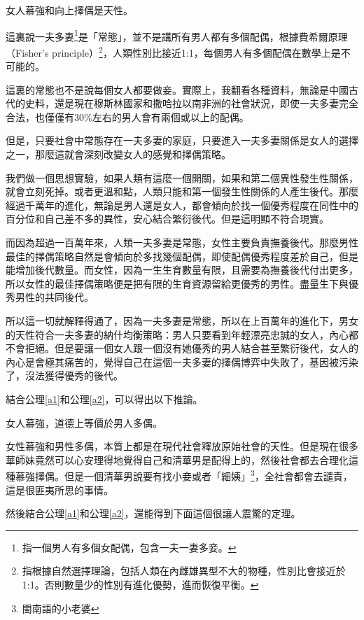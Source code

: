 \begin{theorem}\label{t1}
女人慕強和向上擇偶是天性。
\end{theorem}

這裏說一夫多妻\footnote{指一個男人有多個女配偶，包含一夫一妻多妾。}是「常態」，並不是講所有男人都有多個配偶，根據費希爾原理（Fisher's principle）\footnote{指根據自然選擇理論，包括人類在內雌雄異型不大的物種，性別比會接近於1:1。否則數量少的性別有進化優勢，進而恢復平衡。}，人類性別比接近1:1，每個男人有多個配偶在數學上是不可能的。

這裏的常態也不是說每個女人都要做妾。實際上，我翻看各種資料，無論是中國古代的史料，還是現在穆斯林國家和撒哈拉以南非洲的社會狀況，即使一夫多妻完全合法，也僅僅有30\%左右的男人會有兩個或以上的配偶。

但是，只要社會中常態存在一夫多妻的家庭，只要進入一夫多妻關係是女人的選擇之一，那麼這就會深刻改變女人的感覺和擇偶策略。

我們做一個思想實驗，如果人類有這麼一個開關，如果和第二個異性發生性關係，就會立刻死掉。或者更溫和點，人類只能和第一個發生性關係的人產生後代。那麼經過千萬年的進化，無論是男人還是女人，都會傾向於找一個優秀程度在同性中的百分位和自己差不多的異性，安心結合繁衍後代。但是這明顯不符合現實。

而因為超過一百萬年來，人類一夫多妻是常態，女性主要負責撫養後代。那麼男性最佳的擇偶策略自然是會傾向於多找幾個配偶，即使配偶優秀程度差於自己，但是能增加後代數量。而女性，因為一生生育數量有限，且需要為撫養後代付出更多，所以女性的最佳擇偶策略便是把有限的生育資源留給更優秀的男性。盡量生下與優秀男性的共同後代。

所以這一切就解釋得通了，因為一夫多妻是常態，所以在上百萬年的進化下，男女的天性符合一夫多妻的納什均衡策略：男人只要看到年輕漂亮忠誠的女人，內心都不會拒絕。但是要讓一個女人跟一個沒有她優秀的男人結合甚至繁衍後代，女人的內心是會極其痛苦的，覺得自己在這個一夫多妻的擇偶博弈中失敗了，基因被污染了，沒法獲得優秀的後代。

結合公理\ref{a1}和公理\ref{a2}，可以得出以下推論。

\begin{corollary}\label{c1}
女人慕強，道德上等價於男人多偶。
\end{corollary}

女性慕強和男性多偶，本質上都是在現代社會釋放原始社會的天性。但是現在很多華師妹竟然可以心安理得地覺得自己和清華男是配得上的，然後社會都去合理化這種慕強擇偶。但是一個清華男說要有找小妾或者「細姨」\footnote{閩南語的小老婆}，全社會都會去譴責，這是很匪夷所思的事情。

然後結合公理\ref{a1}和公理\ref{a2}，還能得到下面這個很讓人震驚的定理。

